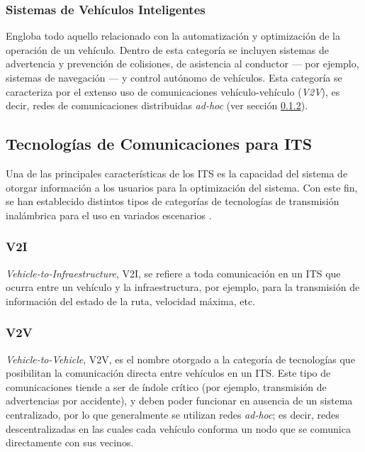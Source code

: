 \subsubsection{Sistemas de Vehículos Inteligentes}

Engloba todo aquello relacionado con la automatización y optimización de la operación de un vehículo. Dentro de esta categoría se incluyen sistemas de advertencia y prevención de colisiones, de asistencia al conductor --- por ejemplo, sistemas de navegación --- y control autónomo de vehículos. Esta categoría se caracteriza por el extenso uso de comunicaciones vehículo-vehículo (\emph{V2V}), es decir, redes de comunicaciones distribuidas \emph{ad-hoc} (ver sección \ref{sec:its_comms:v2v}).

\subsection{Tecnologías de Comunicaciones para ITS}\label{sec:its_comms}

Una de las principales características de los ITS es la capacidad del sistema de otorgar información a los usuarios para la optimización del sistema. Con este fin, se han establecido distintos tipos de categorías de tecnologías de transmisión inalámbrica para el uso en variados escenarios \autocite{dar2010wireless}.

\subsubsection{V2I}

\emph{Vehicle-to-Infraestructure}, V2I, se refiere a toda comunicación en un ITS que ocurra entre un vehículo y la infraestructura, por ejemplo, para la transmisión de información del estado de la ruta, velocidad máxima, etc. 
 
\subsubsection{V2V}\label{sec:its_comms:v2v}

\emph{Vehicle-to-Vehicle}, V2V, es el nombre otorgado a la categoría de tecnologías que posibilitan la comunicación directa entre vehículos en un ITS. Este tipo de comunicaciones tiende a ser de índole crítico (por ejemplo, transmisión de advertencias por accidente), y deben poder funcionar en ausencia de un sistema centralizado, por lo que generalmente se utilizan redes \emph{ad-hoc}; es decir, redes descentralizadas en las cuales cada vehículo conforma un nodo que se comunica directamente con sus vecinos. 

